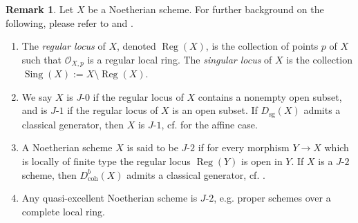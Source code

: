 \documentclass[11pt]{amsart}
\theoremstyle{plain}
\theoremstyle{definition}
\newtheorem{remark}[theorem]{Remark}
\numberwithin{equation}{section}
\numberwithin{theorem}{section}
\begin{document}
\begin{remark}\label{rmk:classical_generator_singularity_category_j1}
    Let $X$ be a Noetherian scheme. For further background on the following, please refer to \cite[\href{https://stacks.math.columbia.edu/tag/07P6}{Tag 07P6}]{StacksProject} and \cite[\href{https://stacks.math.columbia.edu/tag/07R2}{Tag 07R2}]{StacksProject}.
    \begin{enumerate}
        \item The \textit{regular locus} of $X$, denoted $\operatorname{Reg}(X)$, is the collection of points $p$ of $X$ such that $\mathcal{O}_{X,p}$ is a regular local ring. The \textit{singular locus} of $X$ is the collection $\operatorname{Sing}(X):=X\setminus \operatorname{Reg}(X)$. 
        \item We say $X$ is $J\textrm{-}0$ if the regular locus of $X$ contains a nonempty open subset, and is $J\textrm{-}1$ if the regular locus of $X$ is an open subset. If $D_{\textrm{sg}}(X)$ admits a classical generator, then $X$ is $J\textrm{-}1$, cf. \cite[Lemma 2.6]{Iyengar/Takahashi:2019} for the affine case. 
        \item A Noetherian scheme $X$ is said to be $J\textrm{-}2$ if for every morphism $Y \to X$ which is locally of finite type the regular locus $\operatorname{Reg}(Y)$ is open in $Y$. If $X$ is a $J\textrm{-}2$ scheme, then $D^b_{\operatorname{coh}}(X)$ admits a classical generator, cf. \cite[Theorem 4.15]{Elagin/Lunts/Schnurer:2020}. 
        \item Any quasi-excellent Noetherian scheme is $J\textrm{-}2$, e.g. proper schemes over a complete local ring.
    \end{enumerate}
\end{remark}
\end{document}
